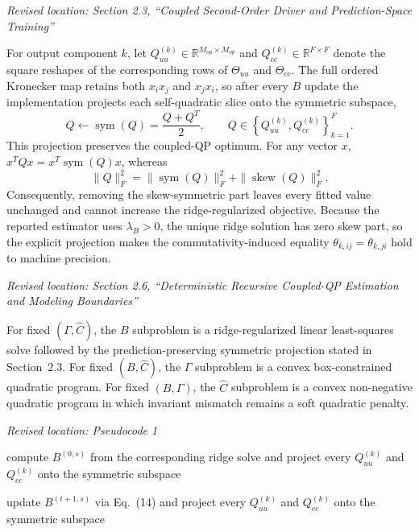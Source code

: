 \documentclass[11pt,a4paper]{article}
\newcommand{\excerptlocation}[1]{\par\noindent\textit{Revised location: #1}\par}
\begin{document}
\excerptlocation{Section 2.3, ``Coupled Second-Order Driver and Prediction-Space Training''}
\begin{revisionexcerpt}
For output component $k$, let $Q_{uu}^{(k)} \in \mathbb{R}^{M_{op} \times M_{op}}$ and $Q_{cc}^{(k)} \in \mathbb{R}^{F \times F}$ denote the square reshapes of the corresponding rows of $\Theta_{uu}$ and $\Theta_{cc}$. The full ordered Kronecker map retains both $x_i x_j$ and $x_j x_i$, so after every $B$ update the implementation projects each self-quadratic slice onto the symmetric subspace,
\begin{equation*}
Q \leftarrow \operatorname{sym}(Q) = \frac{Q + Q^T}{2},
\qquad Q \in \left\{Q_{uu}^{(k)},Q_{cc}^{(k)}\right\}_{k=1}^{F}.
\end{equation*}
This projection preserves the coupled-QP optimum. For any vector $x$, $x^TQx=x^T\operatorname{sym}(Q)x$, whereas
\begin{equation*}
\|Q\|_F^2 = \|\operatorname{sym}(Q)\|_F^2 + \|\operatorname{skew}(Q)\|_F^2.
\end{equation*}
Consequently, removing the skew-symmetric part leaves every fitted value unchanged and cannot increase the ridge-regularized objective. Because the reported estimator uses $\lambda_B>0$, the unique ridge solution has zero skew part, so the explicit projection makes the commutativity-induced equality $\theta_{k,ij}=\theta_{k,ji}$ hold to machine precision.
\end{revisionexcerpt}

\excerptlocation{Section 2.6, ``Deterministic Recursive Coupled-QP Estimation and Modeling Boundaries''}
\begin{revisionexcerpt}
For fixed $(\Gamma, \widehat{C})$, the $B$ subproblem is a ridge-regularized linear least-squares solve followed by the prediction-preserving symmetric projection stated in Section~2.3. For fixed $(B, \widehat{C})$, the $\Gamma$ subproblem is a convex box-constrained quadratic program. For fixed $(B, \Gamma)$, the $\widehat{C}$ subproblem is a convex non-negative quadratic program in which invariant mismatch remains a soft quadratic penalty.
\end{revisionexcerpt}

\excerptlocation{Pseudocode 1}
\begin{revisionexcerpt}
compute $B^{(0,s)}$ from the corresponding ridge solve and project every $Q_{uu}^{(k)}$ and $Q_{cc}^{(k)}$ onto the symmetric subspace

update $B^{(t+1,s)}$ via Eq.~(14) and project every $Q_{uu}^{(k)}$ and $Q_{cc}^{(k)}$ onto the symmetric subspace
\end{revisionexcerpt}
\end{document}
